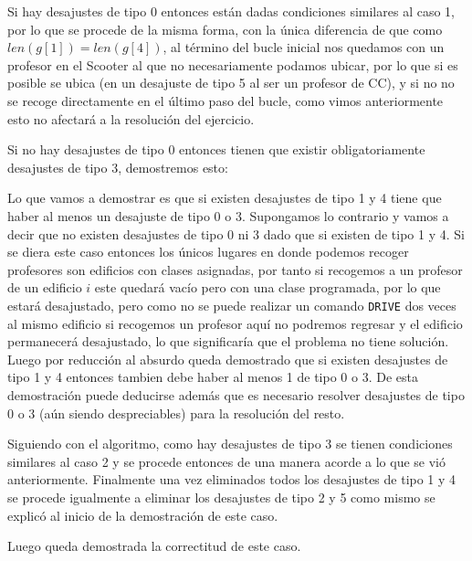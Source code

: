 \documentclass[11pt]{article}
\begin{document}
    Si hay desajustes de tipo 0 entonces están dadas condiciones similares al caso 1, por lo que se procede de la misma forma,
    con la única diferencia de que como $len(g[1]) = len(g[4])$, al término del bucle inicial nos quedamos con un profesor en
    el Scooter al que no necesariamente podamos ubicar, por lo que si es posible se ubica (en un desajuste de tipo 5 al ser un
    profesor de CC), y si no no se recoge directamente en el último paso del bucle, como vimos anteriormente esto no afectará
    a la resolución del ejercicio.

    Si no hay desajustes de tipo 0 entonces tienen que existir obligatoriamente desajustes de tipo 3, demostremos esto:

    Lo que vamos a demostrar es que si existen desajustes de tipo 1 y 4 tiene que haber al menos un desajuste de tipo 0 o 3.
    Supongamos lo contrario y vamos a decir que no existen desajustes de tipo 0 ni 3 dado que si existen de tipo 1 y 4. Si se
    diera este caso entonces los únicos lugares en donde podemos recoger profesores son edificios con clases asignadas, por tanto
    si recogemos a un profesor de un edificio $i$ este quedará vacío pero con una clase programada, por lo que estará desajustado,
    pero como no se puede realizar un comando \texttt{DRIVE} dos veces al mismo edificio si recogemos un profesor aquí no podremos
    regresar y el edificio permanecerá desajustado, lo que significaría que el problema no tiene solución. Luego por reducción al
    absurdo queda demostrado que si existen desajustes de tipo 1 y 4 entonces tambien debe haber al menos 1 de tipo 0 o 3. De esta 
    demostración puede deducirse además que es necesario resolver desajustes de tipo 0 o 3 (aún siendo despreciables) para la 
    resolución del resto.

    Siguiendo con el algoritmo, como hay desajustes de tipo 3 se tienen condiciones similares al caso 2 y se procede entonces de
    una manera acorde a lo que se vió anteriormente. Finalmente una vez eliminados todos los desajustes de tipo 1 y 4 se procede
    igualmente a eliminar los desajustes de tipo 2 y 5 como mismo se explicó al inicio de la demostración de este caso.

    Luego queda demostrada la correctitud de este caso.
\end{document}
